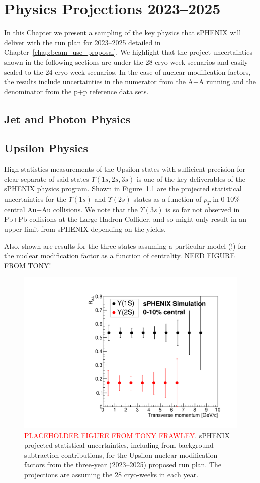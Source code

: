\chapter{Physics Projections 2023--2025}
\label{chap:physics_projections}

In this Chapter we present a sampling of the key physics that sPHENIX will deliver with the run plan for 2023--2025 detailed in Chapter~\ref{chap:beam_use_proposal}.    We highlight that the project uncertainties shown in the following sections are under the 28 cryo-week scenarios and easily scaled to the 24 cryo-week scenarios.  In the case of nuclear modification factors, the results include uncertainties in the numerator from the A+A running and the denominator from the p+p reference data sets.

\section{Jet and Photon Physics}
\label{sec:jet}

\section{Upsilon Physics}
\label{sec:upsilon}

High statistics measurements of the Upsilon states with sufficient precision for clear separate of said states $\Upsilon(1s,2s,3s)$ is one of the key deliverables of the sPHENIX physics program.  Shown in Figure~\ref{fig:upsilon3years} are the projected statistical uncertainties for the $\Upsilon(1s)$ and $\Upsilon(2s)$ states as a function of $p_{T}$ in 0-10\% central Au+Au collisions.   We note that the $\Upsilon(3s)$ is so far not observed in Pb+Pb collisions at the Large Hadron Collider, and so might only result in an upper limit from sPHENIX depending on the yields.   

Also, shown are results for the three-states assuming a particular model (!) for the nuclear modification factor as a function of centrality.   NEED FIGURE FROM TONY!

\begin{figure}
    \centering
    \includegraphics[width=0.55\linewidth]{figs/BUP_Upsilon_RAA_3yr_28wks.pdf}
    \caption{{\textcolor{red}{PLACEHOLDER FIGURE FROM TONY FRAWLEY}}. sPHENIX projected statistical uncertainties, including from background subtraction contributions, for the Upsilon nuclear modification factors from the three-year (2023--2025) proposed run plan.   The projections are assuming the 28 cryo-weeks in each year.
    \label{fig:upsilon3years}}
\end{figure}

